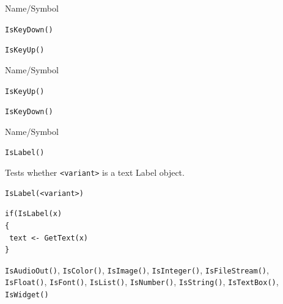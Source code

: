 \begin{desc}{Name/Symbol}
\item[Name/Symbol]	\verb+IsKeyDown()+

\item[Description]	

\item[Usage]		

\item[Example]	

\item[See Also]	\verb+IsKeyUp()+
\end{desc}

\begin{desc}{Name/Symbol}
\item[Name/Symbol]	\verb+IsKeyUp()+

\item[Description]	

\item[Usage]		

\item[Example]	

\item[See Also]	\verb+IsKeyDown()+
\end{desc}

\begin{desc}{Name/Symbol}
\item[Name/Symbol]	\verb+IsLabel()+

\item[Description]	Tests whether \verb+<variant>+ is a text Label object.

\item[Usage]		
\begin{verbatim}
IsLabel(<variant>)
\end{verbatim}

\item[Example]	
\begin{verbatim}
if(IsLabel(x)
{
 text <- GetText(x)
}
\end{verbatim}

\item[See Also] \verb+IsAudioOut()+, \verb+IsColor()+,
  \verb+IsImage()+, \verb+IsInteger()+, \verb+IsFileStream()+,
  \verb+IsFloat()+, \verb+IsFont()+, \verb+IsList()+,
  \verb+IsNumber()+, \verb+IsString()+, \verb+IsTextBox()+,
  \verb+IsWidget()+
\end{desc}

